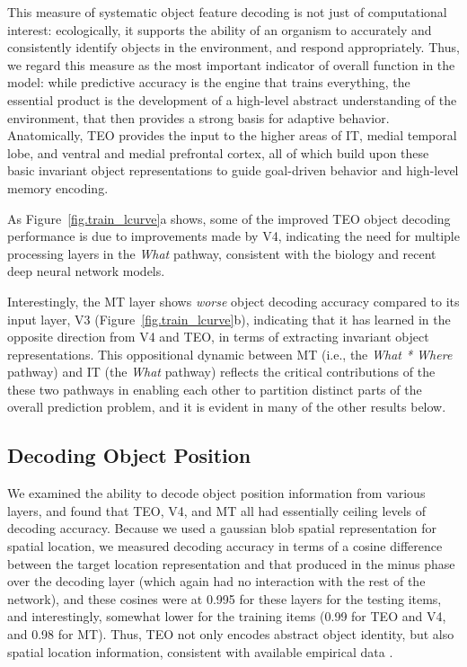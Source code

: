 \documentclass[11pt,twoside]{article}
\newif\myifpdf
\begin{document}
This measure of systematic object feature decoding is not just of computational interest: ecologically, it supports the ability of an organism to accurately and consistently identify objects in the environment, and respond appropriately.  Thus, we regard this measure as the most important indicator of overall function in the model: while predictive accuracy is the engine that trains everything, the essential product is the development of a high-level abstract understanding of the environment, that then provides a strong basis for adaptive behavior.  Anatomically, TEO provides the input to the higher areas of IT, medial temporal lobe, and ventral and medial prefrontal cortex, all of which build upon these basic invariant object representations to guide goal-driven behavior and high-level memory encoding.

As Figure~\ref{fig.train_lcurve}a shows, some of the improved TEO object decoding performance is due to improvements made by V4, indicating the need for multiple processing layers in the {\em What} pathway, consistent with the biology and recent deep neural network models.


Interestingly, the MT layer shows {\em worse} object decoding accuracy compared to its input layer, V3 (Figure~\ref{fig.train_lcurve}b), indicating that it has learned in the opposite direction from V4 and TEO, in terms of extracting invariant object representations.  This oppositional dynamic between MT (i.e., the {\em What * Where} pathway) and IT (the {\em What} pathway) reflects the critical contributions of the these two pathways in enabling each other to partition distinct parts of the overall prediction problem, and it is evident in many of the other results below.

\subsection{Decoding Object Position}
We examined the ability to decode object position information from various layers, and found that TEO, V4, and MT all had essentially ceiling levels of decoding accuracy.  Because we used a gaussian blob spatial representation for spatial location, we measured decoding accuracy in terms of a cosine difference between the target location representation and that produced in the minus phase over the decoding layer (which again had no interaction with the rest of the network), and these cosines were at 0.995 for these layers for the testing items, and interestingly, somewhat lower for the training items (0.99 for TEO and V4, and 0.98 for MT).  Thus, TEO not only encodes abstract object identity, but also spatial location information, consistent with available empirical data \cite{MajajHongSolomonEtAl15}.
\end{document}
